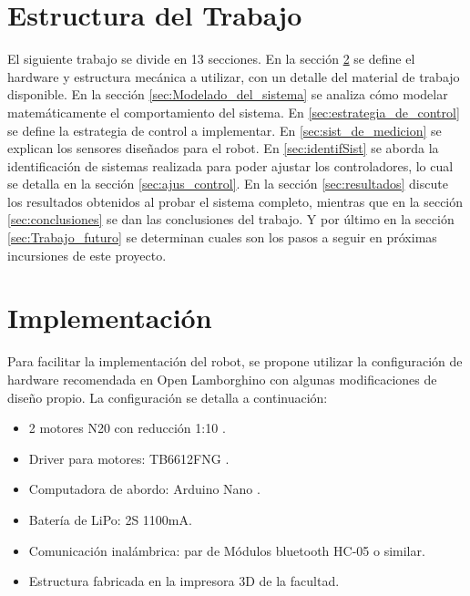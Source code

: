 \documentclass[10pt,conference,a4paper,onecolumn]{article}%
\begin{document}
\section{Estructura del Trabajo}
El siguiente trabajo se divide en 13 secciones. En la sección \ref{sec:implementacion} se define el hardware y estructura mecánica a utilizar, con un detalle del material de trabajo disponible. En la sección \ref{sec:Modelado_del_sistema} se analiza cómo modelar matemáticamente el comportamiento del sistema. En  \ref{sec:estrategia_de_control} se define la estrategia de control a implementar. En \ref{sec:sist_de_medicion} se explican los sensores diseñados para el robot. En \ref{sec:identifSist} se aborda la identificación de sistemas realizada para poder ajustar los controladores, lo cual se detalla en la sección \ref{sec:ajus_control}. En la sección \ref{sec:resultados} discute los resultados obtenidos al probar el sistema completo, mientras que en la sección \ref{sec:conclusiones} se dan las conclusiones del trabajo. Y por último en la sección \ref{sec:Trabajo_futuro} se determinan cuales son los pasos a seguir en próximas incursiones de este proyecto.

\section{Implementación}
\label{sec:implementacion}
Para facilitar la implementación del robot, se propone utilizar la configuración de hardware recomendada en Open Lamborghino con algunas modificaciones de diseño propio. La configuración se detalla a continuación:
\begin{itemize}
\item 2 motores N20 con reducción 1:10 \cite{motores}. 
\item Driver para motores: TB6612FNG \cite{puenteH}.
\item Computadora de abordo: Arduino Nano \cite{arduinoNano}.
\item Batería de LiPo: 2S 1100mA.
\item Comunicación inalámbrica: par de Módulos bluetooth HC-05 o similar.  
\item Estructura fabricada en la impresora 3D de la facultad.

\end{itemize}
\end{document}
